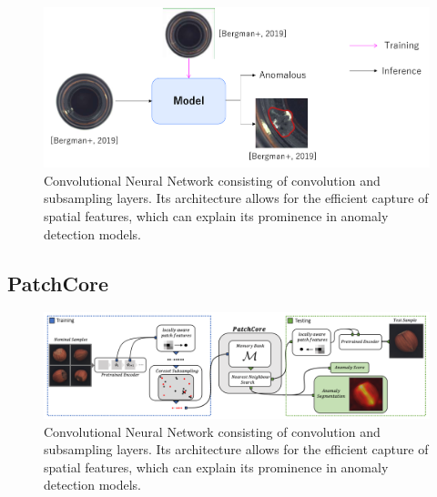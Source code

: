 \begin{figure}[t]
	\begin{center}
		\includegraphics[width=1.0\linewidth]{Chapter_2/uiad.png}
	\end{center}
	\caption{Convolutional Neural Network consisting of convolution and subsampling layers. Its architecture allows for the efficient capture of spatial features, which can explain its prominence in anomaly detection models.}
	\label{fig:cnn}
\end{figure}

\subsection{PatchCore}
\label{patchcore}

\begin{figure}[t]
	\begin{center}
		\includegraphics[width=1.0\linewidth]{Chapter_2/patchcore.png}
	\end{center}
	\caption{Convolutional Neural Network consisting of convolution and subsampling layers. Its architecture allows for the efficient capture of spatial features, which can explain its prominence in anomaly detection models.}
	\label{fig:cnn}
\end{figure}


